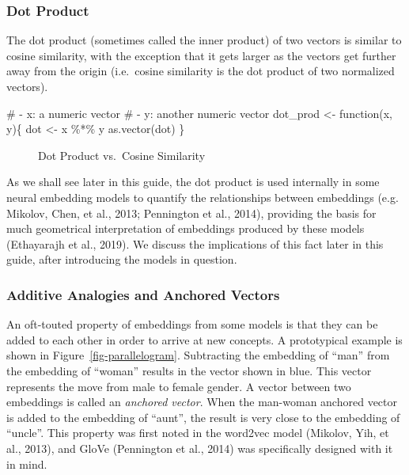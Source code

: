 \documentclass[
  man,
  floatsintext,
  longtable,
  nolmodern,
  notxfonts,
  notimes,
  colorlinks=true,linkcolor=blue,citecolor=blue,urlcolor=blue]{apa7}
\newenvironment{Shaded}{\begin{snugshade}}{\end{snugshade}}
\newcommand{\CommentTok}[1]{\textcolor[rgb]{0.37,0.37,0.37}{#1}}
\newcommand{\ControlFlowTok}[1]{\textcolor[rgb]{0.00,0.23,0.31}{#1}}
\newcommand{\FunctionTok}[1]{\textcolor[rgb]{0.28,0.35,0.67}{#1}}
\newcommand{\NormalTok}[1]{\textcolor[rgb]{0.00,0.23,0.31}{#1}}
\newcommand{\OtherTok}[1]{\textcolor[rgb]{0.00,0.23,0.31}{#1}}
\newcommand{\SpecialCharTok}[1]{\textcolor[rgb]{0.37,0.37,0.37}{#1}}
\begin{document}
\subsubsection{Dot Product}\label{dot-product}

The dot product (sometimes called the inner product) of two vectors is
similar to cosine similarity, with the exception that it gets larger as
the vectors get further away from the origin (i.e.~cosine similarity is
the dot product of two normalized vectors).

\begin{Shaded}
\begin{Highlighting}[]
\CommentTok{\#  {-} \textasciigrave{}x\textasciigrave{}: a numeric vector}
\CommentTok{\#  {-} \textasciigrave{}y\textasciigrave{}: another numeric vector}
\NormalTok{dot\_prod }\OtherTok{\textless{}{-}} \ControlFlowTok{function}\NormalTok{(x, y)\{}
\NormalTok{  dot }\OtherTok{\textless{}{-}}\NormalTok{ x }\SpecialCharTok{\%*\%}\NormalTok{ y}
  \FunctionTok{as.vector}\NormalTok{(dot)}
\NormalTok{\}}
\end{Highlighting}
\end{Shaded}

\begin{figure}

\caption{\label{fig-dotprod}Dot Product vs.~Cosine Similarity}


\end{figure}%

As we shall see later in this guide, the dot product is used internally
in some neural embedding models to quantify the relationships between
embeddings (e.g. Mikolov, Chen, et al., 2013; Pennington et al., 2014),
providing the basis for much geometrical interpretation of embeddings
produced by these models (Ethayarajh et al., 2019). We discuss the
implications of this fact later in this guide, after introducing the
models in question.

\subsubsection{Additive Analogies and Anchored
Vectors}\label{additive-analogies-and-anchored-vectors}

An oft-touted property of embeddings from some models is that they can
be added to each other in order to arrive at new concepts. A
prototypical example is shown in Figure~\ref{fig-parallelogram}.
Subtracting the embedding of ``man'' from the embedding of ``woman''
results in the vector shown in blue. This vector represents the move
from male to female gender. A vector between two embeddings is called an
\emph{anchored vector}. When the man-woman anchored vector is added to
the embedding of ``aunt'', the result is very close to the embedding of
``uncle''. This property was first noted in the word2vec model (Mikolov,
Yih, et al., 2013), and GloVe (Pennington et al., 2014) was specifically
designed with it in mind.
\end{document}
